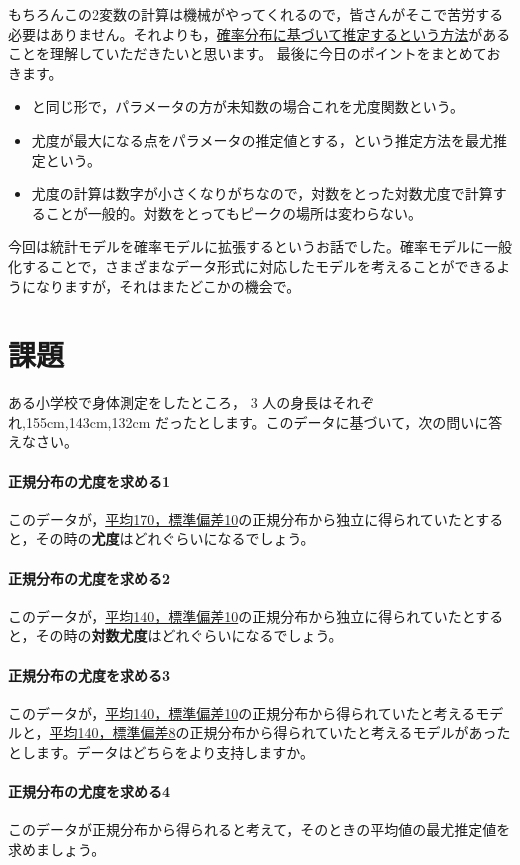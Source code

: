 \documentclass{ltjsbook}
\begin{document}
もちろんこの2変数の計算は機械がやってくれるので，皆さんがそこで苦労する必要はありません。それよりも，\underline{確率分布に基づいて推定するという方法}があることを理解していただきたいと思います。
最後に今日のポイントをまとめておきます。

\begin{itemize}
	\item {}と同じ形で，パラメータの方が未知数の場合これを尤度関数という。
	\item 尤度が最大になる点をパラメータの推定値とする，という推定方法を最尤推定という。
	\item 尤度の計算は数字が小さくなりがちなので，対数をとった対数尤度で計算することが一般的。対数をとってもピークの場所は変わらない。
\end{itemize}

今回は統計モデルを確率モデルに拡張するというお話でした。確率モデルに一般化することで，さまざまなデータ形式に対応したモデルを考えることができるようになりますが，それはまたどこかの機会で。

\section{課題}
ある小学校で身体測定をしたところ， 3 人の身長はそれぞれ,155cm,143cm,132cm だったとします。このデータに基づいて，次の問いに答えなさい。
\paragraph{正規分布の尤度を求める1}このデータが，\underline{平均170，標準偏差10}の正規分布から独立に得られていたとすると，その時の\textbf{尤度}はどれぐらいになるでしょう。
\paragraph{正規分布の尤度を求める2}このデータが，\underline{平均140，標準偏差10}の正規分布から独立に得られていたとすると，その時の\textbf{対数尤度}はどれぐらいになるでしょう。
\paragraph{正規分布の尤度を求める3}このデータが，\underline{平均140，標準偏差10}の正規分布から得られていたと考えるモデルと，\underline{平均140，標準偏差8}の正規分布から得られていたと考えるモデルがあったとします。データはどちらをより支持しますか。
\paragraph{正規分布の尤度を求める4}このデータが正規分布から得られると考えて，そのときの平均値の最尤推定値を求めましょう。
\end{document}
